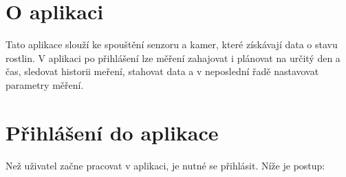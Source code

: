 \documentclass[12pt]{article}
\begin{document}
    \begin{teamwork}

        \section{O aplikaci}\label{sec:o-aplikace}

        Tato aplikace slouží ke spouštění senzoru a kamer, které získávají data o stavu rostlin.
        V aplikaci po přihlášení lze měření zahajovat i plánovat na určitý den a čas, sledovat historii meření,
        stahovat data a v neposlední řadě nastavovat parametry měření.

        \section{Přihlášení do aplikace}\label{sec:prihlaseni-do-aplikace}

        Než uživatel začne pracovat v aplikaci, je nutné se přihlásit.
        Níže je postup:


\end{teamwork}
\end{document}
